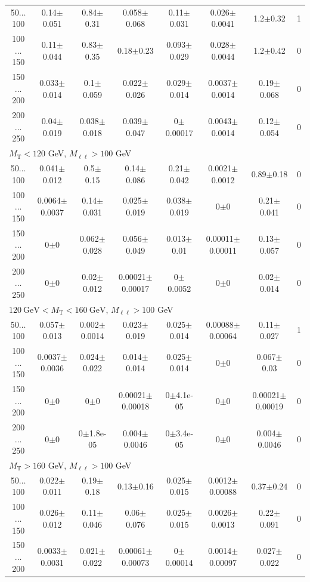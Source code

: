 \begin{landscape}
\begin{table}
\begin{center}
\begin{tabular}{| c | c c c c c c c | }
50$\dots$100&0.14$\pm$0.051&0.84$\pm$0.31&0.058$\pm$0.068&0.11$\pm$0.031&0.026$\pm$0.0041&1.2$\pm$0.32&1\\
100$\dots$150&0.11$\pm$0.044&0.83$\pm$0.35&0.18$\pm$0.23&0.093$\pm$0.029&0.028$\pm$0.0044&1.2$\pm$0.42&0\\
150$\dots$200&0.033$\pm$0.014&0.1$\pm$0.059&0.022$\pm$0.026&0.029$\pm$0.014&0.0037$\pm$0.0014&0.19$\pm$0.068&0\\
200$\dots$250&0.04$\pm$0.019&0.038$\pm$0.018&0.039$\pm$0.047&0$\pm$0.00017&0.0043$\pm$0.0014&0.12$\pm$0.054&0\\
\hline\hline
\multicolumn{8}{l}{$M_{\text{T}} < 120$ GeV, $M_{\ell\ell} > 100$ GeV}\\\hline\hline
50$\dots$100&0.041$\pm$0.012&0.5$\pm$0.15&0.14$\pm$0.086&0.21$\pm$0.042&0.0021$\pm$0.0012&0.89$\pm$0.18&0\\
100$\dots$150&0.0064$\pm$0.0037&0.14$\pm$0.031&0.025$\pm$0.019&0.038$\pm$0.019&0$\pm$0&0.21$\pm$0.041&0\\
150$\dots$200&0$\pm$0&0.062$\pm$0.028&0.056$\pm$0.049&0.013$\pm$0.01&0.00011$\pm$0.00011&0.13$\pm$0.057&0\\
200$\dots$250&0$\pm$0&0.02$\pm$0.012&0.00021$\pm$0.00017&0$\pm$0.0052&0$\pm$0&0.02$\pm$0.014&0\\
\hline\hline
\multicolumn{8}{l}{$120~\mathrm{GeV} < M_{\text{T}} < 160~\mathrm{GeV}$, $M_{\ell\ell} > 100$ GeV}\\\hline\hline
50$\dots$100&0.057$\pm$0.013&0.002$\pm$0.0014&0.023$\pm$0.019&0.025$\pm$0.014&0.00088$\pm$0.00064&0.11$\pm$0.027&1\\
100$\dots$150&0.0037$\pm$0.0036&0.024$\pm$0.022&0.014$\pm$0.014&0.025$\pm$0.014&0$\pm$0&0.067$\pm$0.03&0\\
150$\dots$200&0$\pm$0&0$\pm$0&0.00021$\pm$0.00018&0$\pm$4.1e-05&0$\pm$0&0.00021$\pm$0.00019&0\\
200$\dots$250&0$\pm$0&0$\pm$1.8e-05&0.004$\pm$0.0046&0$\pm$3.4e-05&0$\pm$0&0.004$\pm$0.0046&0\\
\hline\hline
\multicolumn{8}{l}{$M_{\text{T}} > 160$ GeV, $M_{\ell\ell} > 100$ GeV}\\\hline\hline
50$\dots$100&0.022$\pm$0.011&0.19$\pm$0.18&0.13$\pm$0.16&0.025$\pm$0.015&0.0012$\pm$0.00088&0.37$\pm$0.24&0\\
100$\dots$150&0.026$\pm$0.012&0.11$\pm$0.046&0.06$\pm$0.076&0.025$\pm$0.015&0.0026$\pm$0.0013&0.22$\pm$0.091&0\\
150$\dots$200&0.0033$\pm$0.0031&0.021$\pm$0.022&0.00061$\pm$0.00073&0$\pm$0.00014&0.0014$\pm$0.00097&0.027$\pm$0.022&0\\

\end{tabular}
\end{center}
\end{table}
\end{landscape}
